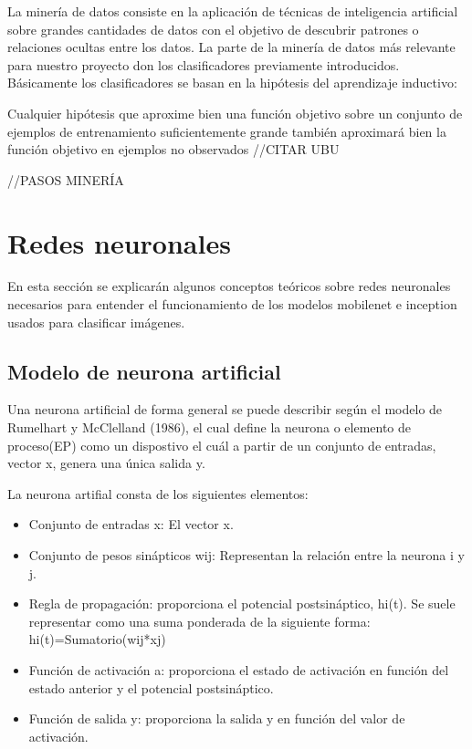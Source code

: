 La minería de datos consiste en la aplicación de técnicas de inteligencia artificial sobre grandes cantidades de datos con el objetivo de descubrir patrones o relaciones ocultas entre los datos. La parte de la minería de datos más relevante para nuestro proyecto don los clasificadores previamente introducidos. Básicamente los clasificadores se basan en la hipótesis del aprendizaje inductivo:

Cualquier hipótesis que aproxime bien una función objetivo sobre un conjunto de ejemplos de entrenamiento suficientemente grande también aproximará bien la función objetivo en ejemplos no observados //CITAR UBU

//PASOS MINERÍA

\section{Redes neuronales}

En esta sección se explicarán algunos conceptos teóricos sobre redes neuronales necesarios para entender el funcionamiento de los modelos mobilenet e inception usados para clasificar imágenes.

\subsection{Modelo de neurona artificial}

Una neurona artificial de forma general se puede describir según el modelo de Rumelhart y McClelland (1986), el cual define la neurona o elemento de proceso(EP) como un dispostivo el cuál a partir de un conjunto de entradas, vector x, genera una única salida y.


La neurona artifial consta de los siguientes elementos:

\begin{itemize}
	\item{Conjunto de entradas x}: El vector x.
	\item{Conjunto de pesos sinápticos wij}: Representan la relación entre la neurona i y j.
	\item{Regla de propagación}: proporciona el potencial postsináptico, hi(t). Se suele representar como una suma ponderada de la siguiente forma:
	hi(t)=Sumatorio(wij*xj)
	\item{Función de activación a}: proporciona el estado de activación en función del estado anterior y el potencial postsináptico.
	\item{Función de salida y}: proporciona la salida y en función del valor de activación.
\end{itemize}

